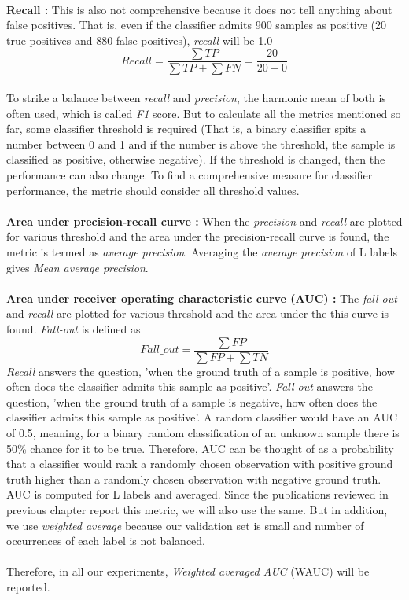 \\
\textbf{Recall :} This is also not comprehensive because it does not tell anything about false positives. That is, even if the classifier admits 900 samples as positive (20 true positives and 880 false positives), \textit{recall} will be 1.0
\[
  Recall = \frac{\sum TP}{\sum TP + \sum FN} = \frac{20}{20+0} 
\]
\\
To strike a balance between \textit{recall} and \textit{precision}, the harmonic mean of both is often used, which is called \textit{F1} score. But to calculate all the metrics mentioned so far, some classifier threshold is required (That is, a binary classifier spits a number between 0 and 1 and if the number is above the threshold, the sample is classified as positive, otherwise negative). If the threshold is changed, then the performance can also change. To find a comprehensive measure for classifier performance, the metric should consider all threshold values.\\
\\ 
\textbf{Area under precision-recall curve :} When the\textit{ precision} and \textit{recall} are plotted for various threshold and the area under the precision-recall curve is found, the metric is termed as \textit{average precision}. Averaging the \textit{average precision} of L labels gives \textit{Mean average precision}.\\
\\
\textbf{Area under receiver operating characteristic curve (AUC) :} The \textit{fall-out} and \textit{recall} are plotted for various threshold and the area under the this curve is found. \textit{Fall-out} is defined as
\[
   Fall\_out = \frac{\sum FP}{\sum FP + \sum TN} 
\]
\textit{Recall} answers the question, 'when the ground truth of a sample is positive, how often does the classifier admits this sample as positive'. \textit{Fall-out} answers the question, 'when the ground truth of a sample is negative, how often does the classifier admits this sample as positive'. A random classifier would have an AUC of 0.5, meaning, for a binary random classification of an unknown sample there is 50\% chance for it to be true. Therefore, AUC can be thought of as a probability that a classifier would rank a randomly chosen observation with positive ground truth higher than a randomly chosen observation with negative ground truth. AUC is computed for L labels and averaged. Since the publications reviewed in previous chapter report this metric, we will also use the same. But in addition, we use \textit{weighted average} because our validation set is small and number of occurrences of each label is not balanced.\\
\\
Therefore, in all our experiments, \textit{Weighted averaged AUC} (WAUC) will be reported.

